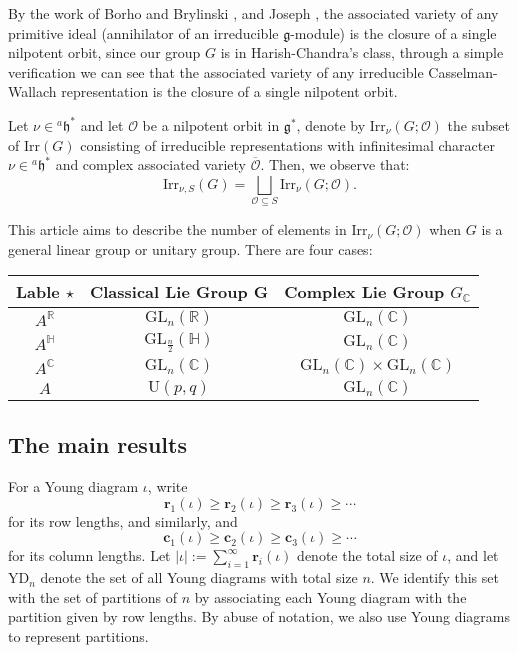 \documentclass[12pt, a4paper]{amsart}
\numberwithin{equation}{section}
\newcommand{\br}{{\mathbf{r}}}
\newcommand{\bc}{{\mathbf{c}}}
\newcommand{\BC}{{\mathbb {C}}}
\newcommand{\BH}{{\mathbb {H}}}
\newcommand{\BR}{{\mathbb {R}}}
\newcommand{\CO}{{\mathcal {O}}}
\newcommand{\fg}{\mathfrak{g}}
\newcommand{\fh}{\mathfrak{h}}
\newcommand{\GL}{{\mathrm{GL}}}
\newcommand{\U}{{\mathrm{U}}}
\newcommand{\Irr}{{\mathrm{Irr}}}
\renewcommand{\bar}{\overline}
\begin{document}
By the work of Borho and Brylinski \cite{BB}, and Joseph \cite{Jos}, the associated variety of any primitive ideal (annihilator of an irreducible $\fg$-module) is the closure of a single nilpotent orbit, since our group $G$ is in Harish-Chandra's class, through a simple verification we can see that the associated variety of any irreducible Casselman-Wallach representation is the closure of a single nilpotent orbit.

Let $\nu \in {^{a}\fh^*}$ and let $\CO$ be a nilpotent orbit in $\fg^*$,   denote by $\Irr_{\nu}(G;\CO)$ the subset of $\Irr(G)$ consisting of irreducible representations with infinitesimal character $\nu \in {^{a}\fh^*}$ and complex associated variety $\bar{\CO}$. Then, we observe that:
\begin{equation}\label{(1.3)}
    \Irr_{\nu,S}(G) = \bigsqcup_{\CO \subseteq S} \Irr_{\nu}(G;\CO).
\end{equation}

This article aims to describe the number of elements in $\Irr_{\nu}(G;\CO)$ when $G$ is a general linear group or unitary group. There are four cases:

\begin{center}
   \begin{tabular}{ccc}
      \toprule
      Lable $\star $ & Classical Lie Group G & Complex Lie Group $G_{\BC}$    \\
      \midrule
      $A^{\BR}$      & $\GL_n(\BR)$          & $\GL_n(\BC)$                   \\
      $A^{\BH}$      & $\GL_{\frac{n}{2}}(\BH)$      & $\GL_n(\BC)$                   \\
      $A^{\BC}$      & $\GL_n(\BC)$          & $\GL_n(\BC) \times \GL_n(\BC)$ \\
      $A$            & $\U(p,q)$              & $\GL_n(\BC)$                   \\
      \bottomrule
   \end{tabular}
\end{center}



\subsection{The main results}
For a Young diagram $\iota$, write
$$\br_1(\iota) \geq \br_2(\iota) \geq \br_3(\iota) \geq \cdots$$
for its row lengths, and similarly, and
$$\bc_1(\iota) \geq \bc_2(\iota) \geq \bc_3(\iota) \geq \cdots$$
for its column lengths. Let $|\iota|:= \sum_{i=1}^{\infty}\br_i(\iota)$ denote the total size of $\iota$, and let $\mathrm{YD}_{n}$ denote the set of all Young diagrams with total size $n$. We identify this set with the set of partitions of $n$ by associating each Young diagram with the partition given by row lengths. By abuse of notation, we also use Young diagrams to represent partitions.
\end{document}
